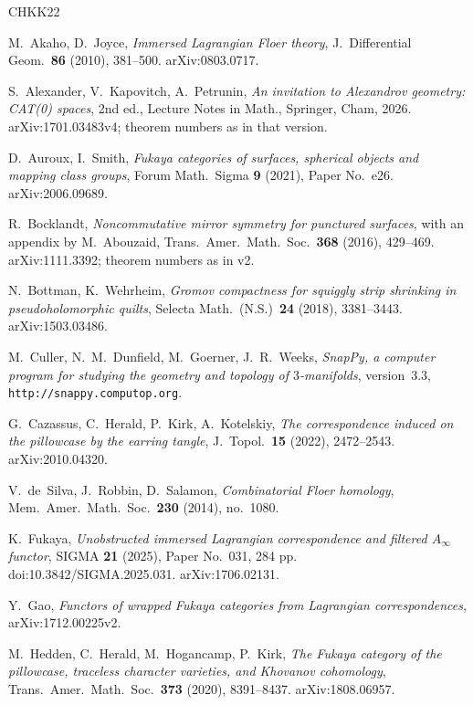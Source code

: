 \documentclass[11pt,reqno]{amsart}
\theoremstyle{plain}
\theoremstyle{definition}
\numberwithin{equation}{section}
\begin{document}
\begin{thebibliography}{CHKK22}

 M.~Akaho, D.~Joyce, \emph{Immersed Lagrangian Floer theory}, J.\ Differential
Geom.\ \textbf{86} (2010), 381--500. arXiv:0803.0717.

 S.~Alexander, V.~Kapovitch, A.~Petrunin, \emph{An invitation to Alexandrov
geometry: CAT(0) spaces}, 2nd ed., Lecture Notes in Math., Springer, Cham, 2026. arXiv:1701.03483v4; theorem
numbers as in that version.

 D.~Auroux, I.~Smith, \emph{Fukaya categories of surfaces, spherical
objects and mapping class groups}, Forum Math.\ Sigma \textbf{9} (2021), Paper No.~e26. arXiv:2006.09689.

 R.~Bocklandt, \emph{Noncommutative mirror symmetry for punctured
surfaces}, with an appendix by M.~Abouzaid, Trans.\ Amer.\ Math.\ Soc.\ \textbf{368} (2016),
429--469. arXiv:1111.3392; theorem numbers as in v2.

 N.~Bottman, K.~Wehrheim, \emph{Gromov compactness for squiggly
strip shrinking in pseudoholomorphic quilts}, Selecta Math.\ (N.S.)\ \textbf{24} (2018), 3381--3443.
arXiv:1503.03486.

 M.~Culler, N.~M.~Dunfield, M.~Goerner, J.~R.~Weeks, \emph{SnapPy, a
computer program for studying the geometry and topology of $3$-manifolds}, version~3.3,
\texttt{http://snappy.computop.org}.

 G.~Cazassus, C.~Herald, P.~Kirk, A.~Kotelskiy, \emph{The correspondence induced on the
pillowcase by the earring tangle}, J.\ Topol.\ \textbf{15} (2022), 2472--2543. arXiv:2010.04320.

 V.~de~Silva, J.~Robbin, D.~Salamon, \emph{Combinatorial Floer homology}, Mem.\ Amer.\
Math.\ Soc.\ \textbf{230} (2014), no.\ 1080.

 K.~Fukaya, \emph{Unobstructed immersed Lagrangian correspondence and
filtered $A_\infty$ functor}, SIGMA \textbf{21} (2025), Paper No.~031, 284 pp.
doi:10.3842/SIGMA.2025.031. arXiv:1706.02131.

 Y.~Gao, \emph{Functors of wrapped Fukaya categories from Lagrangian
correspondences}, arXiv:1712.00225v2.

 M.~Hedden, C.~Herald, M.~Hogancamp, P.~Kirk, \emph{The Fukaya category of the pillowcase,
traceless character varieties, and Khovanov cohomology}, Trans.\ Amer.\ Math.\ Soc.\ \textbf{373} (2020),
8391--8437. arXiv:1808.06957.


\end{thebibliography}
\end{document}
